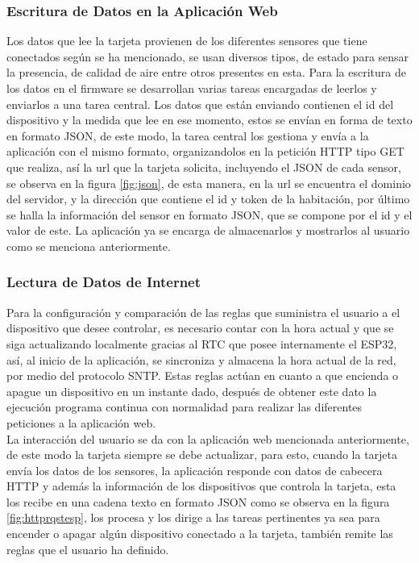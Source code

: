 \subsubsection{Escritura de Datos en la Aplicación Web}

Los datos que lee la tarjeta provienen de los diferentes sensores que tiene conectados según se ha mencionado, se usan diversos tipos, de estado para sensar la presencia, de calidad de aire entre otros presentes en esta. Para la escritura de los datos en el firmware se desarrollan varias tareas encargadas de leerlos y enviarlos a una tarea central. Los datos que están enviando contienen el id del dispositivo y la medida que lee en ese momento, estos se envían en forma de texto en formato JSON, de este modo, la tarea central los gestiona y envía a la aplicación con el mismo formato, organizandolos en la petición HTTP tipo GET que realiza, así la url que la tarjeta solicita, incluyendo el JSON de cada sensor, se observa en la figura \ref{fig:json}, de esta manera, en la url se encuentra el dominio del servidor, y la dirección que contiene el id y token de la habitación, por último se halla la información del sensor en formato JSON, que se compone por el id y el valor de este. La aplicación ya se encarga de almacenarlos y mostrarlos al usuario como se menciona anteriormente.



\subsubsection{Lectura de Datos de Internet}

Para la configuración y comparación de las reglas que suministra el usuario a el dispositivo que desee controlar, es necesario contar con la hora actual y que se siga actualizando localmente gracias al RTC que posee internamente el ESP32, así, al inicio de la aplicación, se sincroniza y almacena la hora actual de la red, por medio del protocolo SNTP. Estas reglas actúan en cuanto a que encienda o apague un dispositivo en un instante dado, después de obtener este dato la ejecución programa continua con normalidad para realizar las diferentes peticiones a la aplicación web.\\

La interacción del usuario se da con la aplicación web mencionada anteriormente, de este modo la tarjeta siempre se debe actualizar, para esto, cuando la tarjeta envía los datos de los sensores, la aplicación responde con datos de cabecera HTTP y además la información de los dispositivos que controla la tarjeta, esta los recibe en una cadena texto en formato JSON como se observa en la figura \ref{fig:httprqstesp}, los procesa y los dirige a las tareas pertinentes ya sea para encender o apagar algún dispositivo conectado a la tarjeta, también remite las reglas que el usuario ha definido.\\

